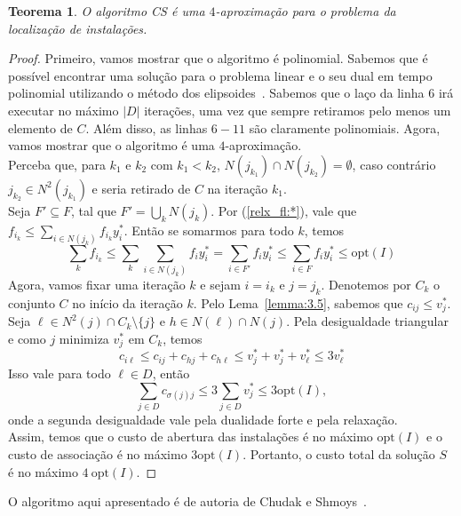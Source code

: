 \documentclass[12pt]{article}
\newcommand{\opt}{\ensuremath{\mathrm{opt}}}
\newtheorem{theorem}{Teorema}[section]
\begin{document}
\begin{theorem}
    O algoritmo {\sc CS} é uma $4$-aproximação para o problema da localização de instalações.
\end{theorem}
\begin{proof}
    Primeiro, vamos mostrar que o algoritmo é polinomial. Sabemos que é possível encontrar uma solução para o problema linear e o seu dual em tempo polinomial utilizando o método dos elipsoides~\cite{Kha79}. Sabemos que o laço da linha 6 irá executar no máximo $|D|$ iterações, uma vez que sempre retiramos pelo menos um elemento de $C$. Além disso, as linhas $6-11$ são claramente polinomiais.
    Agora, vamos mostrar que o algoritmo é uma $4$-aproximação.\\
    Perceba que, para $k_1$ e $k_2$ com $k_1 < k_2$, $N(j_{k_1})\cap N(j_{k_2}) = \emptyset$, caso contrário $j_{k_2} \in N^2(j_{k_1})$ e seria retirado de $C$ na iteração $k_1$.\\
    Seja $F' \subseteq F$, tal que $F' = \bigcup_k N(j_k)$.
    Por (\ref{relx_fl:*}), vale que $f_{i_k} \leq \sum_{i \in N(j_k)}f_{i_k}y^*_{i}$. Então se somarmos para todo $k$, temos
    \[ \sum_kf_{i_k} \leq \sum_k \sum_{i \in N(j_k)}f_{i}y^*_{i} = \sum_{i \in F'}f_{i}y^*_{i} \leq \sum_{i \in F}f_{i}y^*_{i} \leq \opt(I)\]
    Agora, vamos fixar uma iteração $k$ e sejam $i = i_k$ e $j = j_k$. Denotemos por $C_k$ o conjunto $C$ no início da iteração $k$. Pelo Lema~\ref{lemma:3.5}, sabemos que $c_{ij} \leq v^*_j$. Seja $\ell \in N^2(j) \cap C_k \setminus \{j\}$ e $h \in N(\ell) \cap N(j)$. Pela desigualdade triangular e como $j$ minimiza $v^*_j$ em $C_k$, temos
    \[ c_{i\ell} \leq c_{ij} + c_{hj} + c_{h\ell} \leq v_j^* + v_j^* + v_{\ell}^* \leq 3 v_{\ell}^*
        \]
    Isso vale para todo $\ell \in D$, então
    \[\sum_{j\in D} c_{\sigma(j)j} \leq 3 \sum_{j \in D} v^*_j \leq 3\opt(I),\]
    onde a segunda desigualdade vale pela dualidade forte e pela relaxação. \\
    Assim, temos que o custo de abertura das instalações é no máximo $\opt(I)$ e o custo de associação é no máximo $3\opt(I)$. Portanto, o custo total da solução $S$ é no máximo $4~\opt(I)$.
\end{proof}
O algoritmo aqui apresentado é de autoria de Chudak e Shmoys~\cite{Chudak2003}.

\newpage
\end{document}
